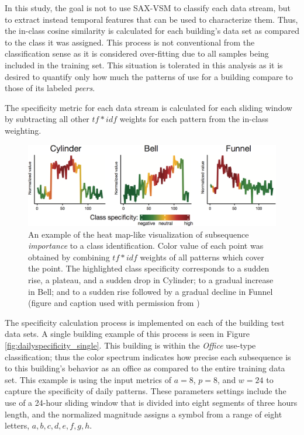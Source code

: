 In this study, the goal is not to use SAX-VSM to classify each data stream, but to extract instead temporal features that can be used to characterize them. Thus, the in-class cosine similarity is calculated for each building's data set as compared to the class it was assigned. This process is not conventional from the classification sense as it is considered over-fitting due to all samples being included in the training set. This situation is tolerated in this analysis as it is desired to quantify only how much the patterns of use for a building compare to those of its labeled \emph{peers}.

The specificity metric for each data stream is calculated for each sliding window by subtracting all other $tf*idf$ weights for each pattern from the in-class weighting. 

\begin{figure}[ht!]
\begin{center}
\includegraphics[width=1\columnwidth]{figures/jmotif_tfidfspec/jmotif_tfidfspec}
\caption{An example of the heat map-like visualization of subsequence \emph{importance} to a class identification. Color value of each point was obtained by combining $tf*idf$ weights of all patterns which cover the point. The highlighted class specificity corresponds to a sudden rise, a plateau, and a sudden drop in Cylinder; to a gradual increase in Bell; and to a sudden rise followed by a gradual decline in Funnel (figure and caption used with permission from \citep{senin_sax-vsm:_2013})
\label{fig:specificity_example}%
}
\end{center}
\end{figure}

The specificity calculation process is implemented on each of the building test data sets. A single building example of this process is seen in Figure \ref{fig:dailyspecificity_single}. This building is within the \emph{Office} use-type classification; thus the color spectrum indicates how precise each subsequence is to this building's behavior as an office as compared to the entire training data set. This example is using the input metrics of $a=8$, $p=8$, and $w=24$ to capture the specificity of daily patterns. These parameters settings include the use of a 24-hour sliding window that is divided into eight segments of three hours length, and the normalized magnitude assigns a symbol from a range of eight letters, $a,b,c,d,e,f,g,h$.

